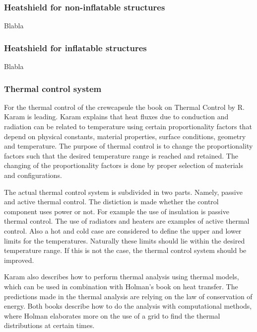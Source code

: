 \subsubsection{Heatshield for non-inflatable structures}
Blabla

\subsubsection{Heatshield for inflatable structures}
Blabla

\subsubsection{Thermal control system}
For the thermal control of the crewcapsule the book on Thermal Control by R. Karam is leading. \cite{Karam1998} Karam explains that heat fluxes due to conduction and radiation can be related to temperature using certain proportionality factors that depend on physical constants, material properties, surface conditions, geometry and temperature. The purpose of thermal control is to change the proportionality factors such that the desired temperature range is reached and retained. The changing of the proportionality factors is done by proper selection of materials and configurations.

The actual thermal control system is subdivided in two parts. Namely, passive and active thermal control. The distiction is made whether the control component uses power or not. For example the use of insulation is passive thermal control. The use of radiators and heaters are examples of active thermal control. Also a hot and cold case are considered to define the upper and lower limits for the temperatures. Naturally these limits should lie within the desired temperature range. If this is not the case, the thermal control system should be improved.

Karam also describes how to perform thermal analysis using thermal models, which can be used in combination with Holman's book on heat transfer. \cite{Holman2002} The predictions made in the thermal analysis are relying on the law of conservation of energy. Both books describe how to do the analysis with computational methods, where Holman elaborates more on the use of a grid to find the thermal distributions at certain times.



